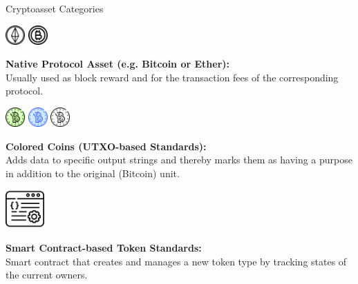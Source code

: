 \documentclass[handout]{beamer}
\begin{document}
\begin{frame}{Cryptoasset Categories}
	\begin{minipage}{0.2\textwidth}
			\begin{center}
				\includegraphics[height=2em]{../assets/images/ethertoken}
				\includegraphics[height=2em]{../assets/images/bitcointoken}
			\end{center}
		\end{minipage}
		\begin{minipage}{0.75\textwidth}
			\textbf{Native Protocol Asset (e.g. Bitcoin or Ether):} \\
			Usually used as block reward and for the transaction fees of the corresponding protocol.
		\end{minipage}
	
		\pause
		\vspace{2 em}
		\begin{minipage}{0.2\textwidth}
			\begin{center}
				\includegraphics[height=2em]{../assets/images/green_coin}
				\includegraphics[height=2em]{../assets/images/blue_coin}
				\includegraphics[height=2em]{../assets/images/grey_coin}
			\end{center}
		\end{minipage}
		\begin{minipage}{0.75\textwidth}
			\textbf{Colored Coins (UTXO-based Standards):} \\
			Adds data to specific output strings and thereby marks them as having a purpose in addition to the original (Bitcoin) unit.
		\end{minipage}
	
		\pause
		\vspace{2 em}
		\begin{minipage}{0.2\textwidth}
			\begin{center}
				\includegraphics[height=4em]{../assets/images/CA}
			\end{center}
		\end{minipage}
		\begin{minipage}{0.75\textwidth}
			\textbf{Smart Contract-based Token Standards:} \\
			Smart contract that creates and manages a new token type by tracking states of the current owners.	
		\end{minipage}


\end{frame}
\end{document}
